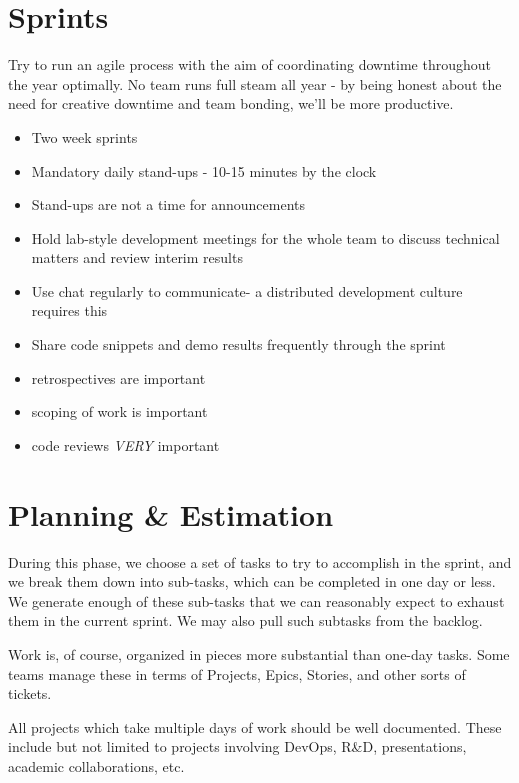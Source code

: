 \documentclass[
  11pt,
]{book}
\providecommand{\tightlist}{%
  \setlength{\itemsep}{0pt}\setlength{\parskip}{0pt}}
\begin{document}
\hypertarget{sprints}{%
\section{Sprints}\label{sprints}}

Try to run an agile process with the aim of coordinating downtime throughout the year optimally. No team runs full steam all year - by being honest about the need for creative downtime and team bonding, we'll be more productive.

\begin{itemize}
\tightlist
\item
  Two week sprints
\item
  Mandatory daily stand-ups - 10-15 minutes by the clock
\item
  Stand-ups are not a time for announcements
\item
  Hold lab-style development meetings for the whole team to discuss technical matters and review interim results
\item
  Use chat regularly to communicate- a distributed development culture requires this
\item
  Share code snippets and demo results frequently through the sprint
\item
  retrospectives are important
\item
  scoping of work is important
\item
  code reviews \emph{VERY} important
\end{itemize}

\hypertarget{planning-estimation}{%
\section{Planning \& Estimation}\label{planning-estimation}}

During this phase, we choose a set of tasks to try to accomplish in the sprint, and we break them down into sub-tasks, which can be completed in one day or less. We generate enough of these sub-tasks that we can reasonably expect to exhaust them in the current sprint. We may also pull such subtasks from the backlog.

Work is, of course, organized in pieces more substantial than one-day tasks. Some teams manage these in terms of Projects, Epics, Stories, and other sorts of tickets.

All projects which take multiple days of work should be well documented. These include but not limited to projects involving DevOps, R\&D, presentations, academic collaborations, etc.
\end{document}
